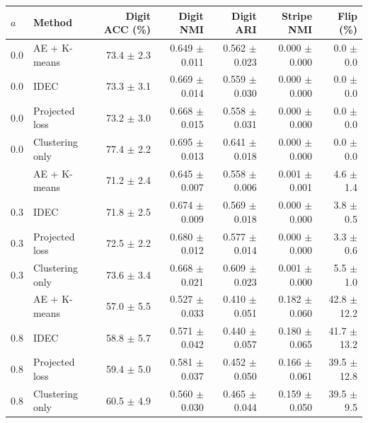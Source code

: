 \begin{tabular}{llrrrrr}
\toprule
$a$ & Method & Digit ACC (\%) & Digit NMI & Digit ARI & Stripe NMI & Flip (\%)\\
\midrule
0.0 & AE + K-means & 73.4 $\pm$ 2.3 & 0.649 $\pm$ 0.011 & 0.562 $\pm$ 0.023 & 0.000 $\pm$ 0.000 & 0.0 $\pm$ 0.0\\
0.0 & IDEC & 73.3 $\pm$ 3.1 & 0.669 $\pm$ 0.014 & 0.559 $\pm$ 0.030 & 0.000 $\pm$ 0.000 & 0.0 $\pm$ 0.0\\
0.0 & Projected loss & 73.2 $\pm$ 3.0 & 0.668 $\pm$ 0.015 & 0.558 $\pm$ 0.031 & 0.000 $\pm$ 0.000 & 0.0 $\pm$ 0.0\\
0.0 & Clustering only & 77.4 $\pm$ 2.2 & 0.695 $\pm$ 0.013 & 0.641 $\pm$ 0.018 & 0.000 $\pm$ 0.000 & 0.0 $\pm$ 0.0\\
\addlinespace
0.3 & AE + K-means & 71.2 $\pm$ 2.4 & 0.645 $\pm$ 0.007 & 0.558 $\pm$ 0.006 & 0.001 $\pm$ 0.001 & 4.6 $\pm$ 1.4\\
0.3 & IDEC & 71.8 $\pm$ 2.5 & 0.674 $\pm$ 0.009 & 0.569 $\pm$ 0.018 & 0.000 $\pm$ 0.000 & 3.8 $\pm$ 0.5\\
0.3 & Projected loss & 72.5 $\pm$ 2.2 & 0.680 $\pm$ 0.012 & 0.577 $\pm$ 0.014 & 0.000 $\pm$ 0.000 & 3.3 $\pm$ 0.6\\
0.3 & Clustering only & 73.6 $\pm$ 3.4 & 0.668 $\pm$ 0.021 & 0.609 $\pm$ 0.023 & 0.001 $\pm$ 0.000 & 5.5 $\pm$ 1.0\\
\addlinespace
0.8 & AE + K-means & 57.0 $\pm$ 5.5 & 0.527 $\pm$ 0.033 & 0.410 $\pm$ 0.051 & 0.182 $\pm$ 0.060 & 42.8 $\pm$ 12.2\\
0.8 & IDEC & 58.8 $\pm$ 5.7 & 0.571 $\pm$ 0.042 & 0.440 $\pm$ 0.057 & 0.180 $\pm$ 0.065 & 41.7 $\pm$ 13.2\\
0.8 & Projected loss & 59.4 $\pm$ 5.0 & 0.581 $\pm$ 0.037 & 0.452 $\pm$ 0.050 & 0.166 $\pm$ 0.061 & 39.5 $\pm$ 12.8\\
0.8 & Clustering only & 60.5 $\pm$ 4.9 & 0.560 $\pm$ 0.030 & 0.465 $\pm$ 0.044 & 0.159 $\pm$ 0.050 & 39.5 $\pm$ 9.5\\
\bottomrule
\end{tabular}
